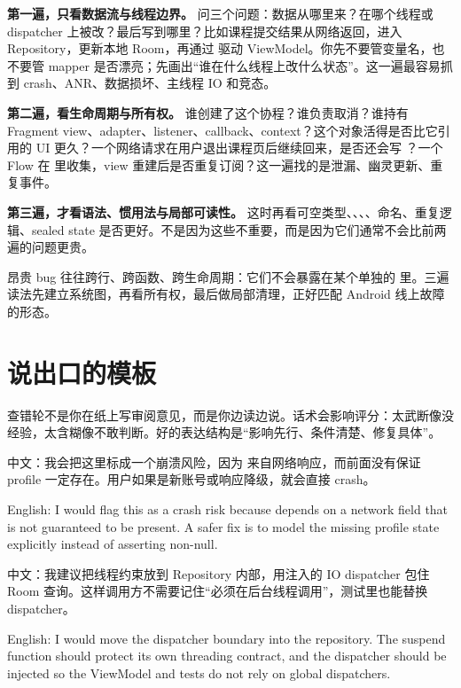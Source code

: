 \textbf{第一遍，只看数据流与线程边界。} 问三个问题：数据从哪里来？在哪个线程或 dispatcher 上被改？最后写到哪里？比如课程提交结果从网络返回，进入 Repository，更新本地 Room，再通过  驱动 ViewModel。你先不要管变量名，也不要管 mapper 是否漂亮；先画出“谁在什么线程上改什么状态”。这一遍最容易抓到 crash、ANR、数据损坏、主线程 IO 和竞态。

\textbf{第二遍，看生命周期与所有权。} 谁创建了这个协程？谁负责取消？谁持有 Fragment view、adapter、listener、callback、context？这个对象活得是否比它引用的 UI 更久？一个网络请求在用户退出课程页后继续回来，是否还会写 ？一个 Flow 在  里收集，view 重建后是否重复订阅？这一遍找的是泄漏、幽灵更新、重复事件。

\textbf{第三遍，才看语法、惯用法与局部可读性。} 这时再看可空类型、\code{!!}、、、命名、重复逻辑、sealed state 是否更好。不是因为这些不重要，而是因为它们通常不会比前两遍的问题更贵。

\begin{keypoint}[为什么这个顺序有效]
昂贵 bug 往往跨行、跨函数、跨生命周期：它们不会暴露在某个单独的  里。三遍读法先建立系统图，再看所有权，最后做局部清理，正好匹配 Android 线上故障的形态。 \srcinferred
\end{keypoint}

\section{说出口的模板}

查错轮不是你在纸上写审阅意见，而是你边读边说。话术会影响评分：太武断像没经验，太含糊像不敢判断。好的表达结构是“影响先行、条件清楚、修复具体”。

\begin{sayit}[提出问题]
中文：我会把这里标成一个崩溃风险，因为  来自网络响应，而前面没有保证 profile 一定存在。用户如果是新账号或响应降级，就会直接 crash。\par
English: I would flag this as a crash risk because  depends on a network field that is not guaranteed to be present. A safer fix is to model the missing profile state explicitly instead of asserting non-null.
\end{sayit}

\begin{sayit}[给出修复]
中文：我建议把线程约束放到 Repository 内部，用注入的 IO dispatcher 包住 Room 查询。这样调用方不需要记住“必须在后台线程调用”，测试里也能替换 dispatcher。\par
English: I would move the dispatcher boundary into the repository. The suspend function should protect its own threading contract, and the dispatcher should be injected so the ViewModel and tests do not rely on global dispatchers.
\end{sayit}

